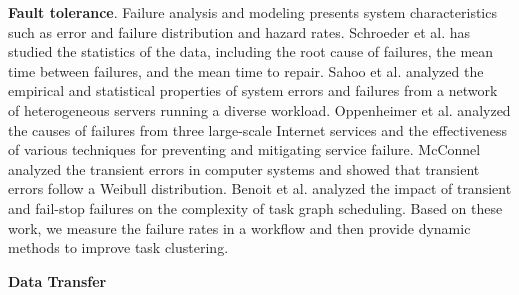 \textbf{Fault tolerance}. Failure analysis and modeling \cite{Tang1990} presents system characteristics such as error and failure distribution and hazard rates. Schroeder et al. \cite{Schroeder2006} has studied the statistics of the data, including the root cause of failures, the mean time between failures, and the mean time to repair. Sahoo et al. \cite{Sahoo2004} analyzed the empirical and statistical properties of system errors and failures from a network of heterogeneous servers running a diverse workload. Oppenheimer et al. \cite{Oppenheimer2002} analyzed the causes of failures from three large-scale Internet services and the effectiveness of various techniques for preventing and mitigating service failure. McConnel \cite{Mcconnel1979} analyzed the transient errors in computer systems and showed that transient errors follow a Weibull distribution. Benoit \cite{Benoit2010} et al. analyzed the impact of transient and fail-stop failures on the complexity of task graph scheduling. Based on these work, we measure the failure rates in a workflow and then provide dynamic methods to improve task clustering.  

\textbf{Data Transfer}